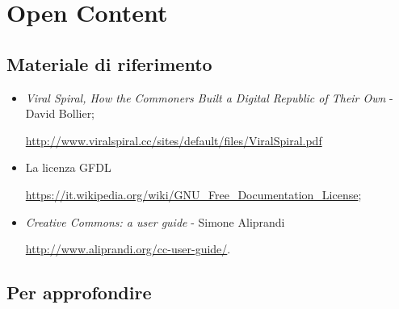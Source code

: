 \section{Open Content}

\subsection*{Materiale di riferimento}

\begin{itemize}

\item \textit{Viral Spiral, How the Commoners Built a Digital Republic of Their Own} - David Bollier;

\url{http://www.viralspiral.cc/sites/default/files/ViralSpiral.pdf}

\item La licenza GFDL 

\url{https://it.wikipedia.org/wiki/GNU_Free_Documentation_License};
\item \textit{Creative Commons: a user guide} - Simone Aliprandi

 \url{http://www.aliprandi.org/cc-user-guide/}.
\end{itemize}

\subsection*{Per approfondire}


